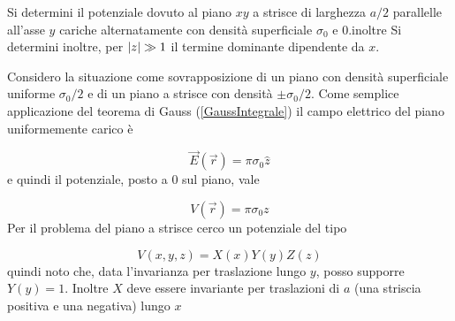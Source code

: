 \documentclass[../main.tex]{subfiles}
\begin{document}

\textex

Si determini il potenziale dovuto al piano $xy$ a strisce di larghezza $a/2$ parallelle all'asse $y$ cariche alternatamente con densità superficiale $\sigma_0$  e $0$.\newline inoltre
Si determini inoltre, per $\lvert z\rvert \gg 1$ il termine dominante dipendente da $x$.

\solution
Considero la situazione come sovrapposizione di un piano con densità superficiale uniforme $\sigma_0/2$ e di un piano a strisce con densità $\pm \sigma_0/2$.
Come semplice applicazione del teorema di Gauss (\cref{GaussIntegrale}) il campo elettrico del piano uniformemente carico è

\begin{equation*}
  \vec E (\vec r)= \pi \sigma_0 \hat z 
\end{equation*}
e quindi il potenziale, posto a $0$ sul piano, vale

\begin{equation}
  \label{pz:potenzialeuniforme}
  V(\vec r)= \pi \sigma_0 z
\end{equation}
Per il problema del piano a strisce cerco un potenziale del tipo

\begin{equation*}
  V(x, y, z)=X(x)Y(y)Z(z)
\end{equation*}
quindi noto che, data l'invarianza per traslazione lungo $y$, posso supporre $Y(y)=1$.
Inoltre $X$ deve essere invariante per traslazioni di $a$ (una striscia positiva e una negativa) lungo $x$
\end{document}
